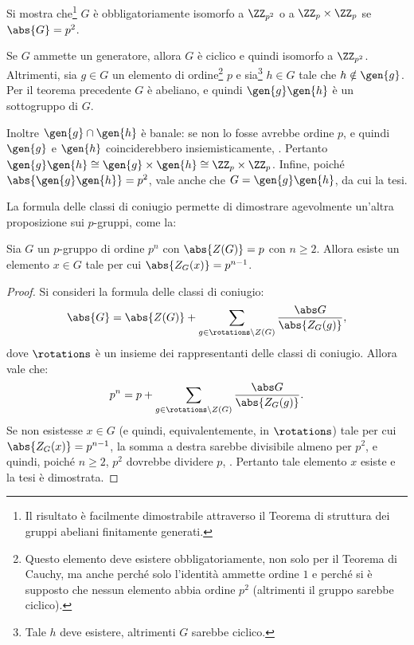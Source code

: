 \documentclass[12pt]{scrartcl}
\begin{document}
	
	\begin{example}
		Si mostra che\footnote{
			Il risultato è facilmente dimostrabile attraverso
			il Teorema di struttura dei gruppi abeliani
			finitamente generati.
		} $G$ è obbligatoriamente isomorfo a
		$\ZZ_{p^2}$ o a $\ZZ_p \times \ZZ_p$ se
		$\abs{G} = p^2$. \vskip 0.1in
		

		Se $G$ ammette un generatore,
		allora $G$ è ciclico e quindi isomorfo a $\ZZ_{p^2}$.
		Altrimenti, sia $g \in G$ un elemento di ordine\footnote{
			Questo elemento deve esistere obbligatoriamente, non
			solo per il Teorema di Cauchy, ma anche perché solo
			l'identità ammette ordine $1$ e perché si è supposto
			che nessun elemento abbia ordine $p^2$ (altrimenti
			il gruppo sarebbe ciclico).
		} $p$ e sia\footnote{
			Tale $h$ deve esistere, altrimenti $G$ sarebbe ciclico.
		} $h \in G$ tale che $h \notin \gen{g}$. Per il teorema
		precedente $G$ è abeliano, e quindi $\gen{g}\gen{h}$ è
		un sottogruppo di $G$. \medskip
		
		
		Inoltre $\gen{g} \cap \gen{h}$ è
		banale: se non lo fosse avrebbe ordine $p$, e quindi
		$\gen{g}$ e $\gen{h}$ coinciderebbero insiemisticamente,
		\Lightning. Pertanto $\gen{g}\gen{h} \cong \gen{g}
		\times \gen{h} \cong \ZZ_p \times \ZZ_p$. Infine, poiché
		$\abs{\gen{g} \gen{h}} = p^2$, vale anche che
		$G = \gen{g} \gen{h}$, da cui la tesi.
	\end{example} \medskip
	
	
	La formula delle classi di coniugio permette di dimostrare
	agevolmente un'altra proposizione sui $p$-gruppi, come la:
	
	\begin{proposition}
		Sia $G$ un $p$-gruppo di ordine $p^n$ con $\abs{Z(G)} = p$
		con $n \geq 2$. Allora esiste un elemento $x \in G$ tale
		per cui $\abs{Z_G(x)} = p^{n-1}$.
	\end{proposition}
	
	\begin{proof}
		Si consideri la formula delle classi di coniugio:
		\[ \abs{G} = \abs{Z(G)} + \sum_{g \in \rotations \setminus Z(G)} \frac{\abs G}{\abs{Z_G(g)}}, \]
		dove $\rotations$ è un insieme dei rappresentanti delle
		classi di coniugio. Allora vale che:
		\[ p^n = p + \sum_{g \in \rotations \setminus Z(G)} \frac{\abs G}{\abs{Z_G(g)}}. \]
		Se non esistesse $x \in G$ (e quindi, equivalentemente,
		in $\rotations$) tale per cui $\abs{Z_G(x)} = p^{n-1}$, la somma a destra
		sarebbe divisibile almeno per $p^2$, e quindi, poiché
		$n \geq 2$, $p^2$ dovrebbe dividere $p$, \Lightning. Pertanto
		tale elemento $x$ esiste e la tesi è dimostrata.
	\end{proof} \medskip
	
\end{document}
